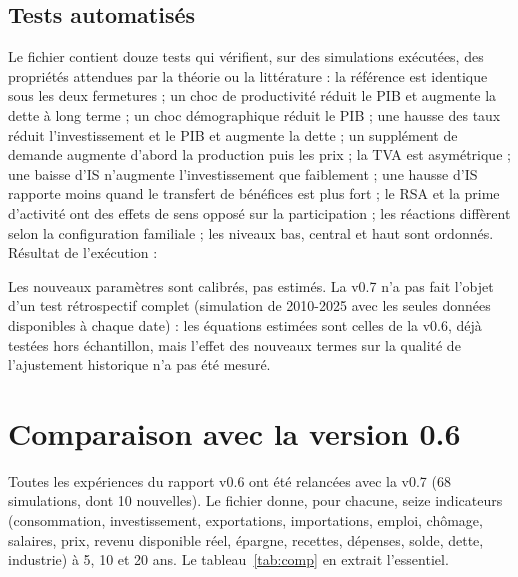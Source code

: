 \section{Tests automatisés}

Le fichier  contient douze tests qui vérifient, sur des simulations exécutées, des
propriétés attendues par la théorie ou la littérature : la référence est identique sous les deux fermetures ; un choc
de productivité réduit le PIB et augmente la dette à long terme ; un choc démographique réduit le PIB ; une hausse
des taux réduit l'investissement et le PIB et augmente la dette ; un supplément de demande augmente d'abord la
production puis les prix ; la TVA est asymétrique ; une baisse d'IS n'augmente l'investissement que faiblement ;
une hausse d'IS rapporte moins quand le transfert de bénéfices est plus fort ; le RSA et la prime d'activité ont des
effets de sens opposé sur la participation ; les réactions diffèrent selon la configuration familiale ; les niveaux
bas, central et haut sont ordonnés. Résultat de l'exécution : 

\begin{limites}
Les nouveaux paramètres sont calibrés, pas estimés. La v0.7 n'a pas fait l'objet d'un test rétrospectif complet
(simulation de 2010-2025 avec les seules données disponibles à chaque date) : les équations estimées sont celles de la
v0.6, déjà testées hors échantillon, mais l'effet des nouveaux termes sur la qualité de l'ajustement historique n'a
pas été mesuré.
\end{limites}

\chapter{Comparaison avec la version 0.6}\label{ch:comparaison}

Toutes les expériences du rapport v0.6 ont été relancées avec la v0.7 (68 simulations, dont 10 nouvelles). Le fichier
 donne, pour chacune, seize indicateurs (consommation, investissement, exportations,
importations, emploi, chômage, salaires, prix, revenu disponible réel, épargne, recettes, dépenses, solde, dette,
industrie) à 5, 10 et 20 ans. Le tableau~\ref{tab:comp} en extrait l'essentiel.

